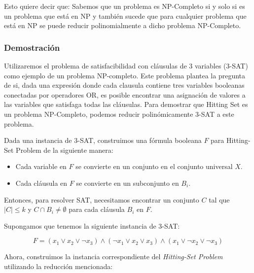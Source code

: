 \documentclass{estilo}
\begin{document}
Esto quiere decir que: Sabemos que un problema es NP-Completo si y solo si es un problema que está en NP y también sucede que para cualquier problema que está en NP se puede reducir polinomialmente a dicho problema NP-Completo.

\newpage
\subsubsection{Demostración}

Utilizaremos el problema de satisfacibilidad con cláusulas de 3 variables (3-SAT) como ejemplo de un problema NP-completo. Este problema plantea la pregunta de si, dada una expresión donde cada clausula contiene tres variables booleanas conectadas por operadores OR, es posible encontrar una asignación de valores a las variables que satisfaga todas las cláusulas. Para demostrar que Hitting Set es un problema NP-Completo, podemos reducir polinómicamente 3-SAT a este problema.

Dada una instancia de 3-SAT, construimos una fórmula booleana \(F\) para Hitting-Set Problem de la siguiente manera:

\begin{itemize}
    \item Cada variable en \(F\) se convierte en un conjunto en el conjunto universal \(X\).
    \item Cada cláusula en \(F\) se convierte en un subconjunto en \(B_i\).
\end{itemize}


Entonces, para resolver SAT, necesitamos encontrar un conjunto \(C\) tal que \(|C| \leq k\) y \(C \cap B_i \neq \emptyset\) para cada cláusula \(B_i\) en \(F\).

Supongamos que tenemos la siguiente instancia de 3-SAT:

\[ F = (x_1 \lor x_2 \lor \neg x_3) \land (\neg x_1 \lor x_2 \lor x_3) \land (x_1 \lor \neg x_2 \lor \neg x_3) \]

Ahora, construimos la instancia correspondiente del \textit{Hitting-Set Problem} utilizando la reducción mencionada:
\end{document}
